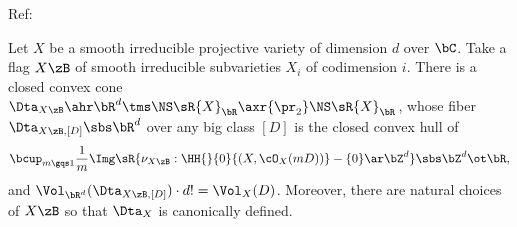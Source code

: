 \documentclass[a4paper, twoside]{article}
\begin{document}
\confighead{}{}{}


Ref:~\cite{LM2009Convex}


\begin{thm}
    Let $X$ be a smooth irreducible projective variety of dimension $d$ over $\bC$. Take a flag $X\zB$ of smooth irreducible subvarieties $X_{i}$ of codimension $i$. There is a closed convex cone $\Dta_{X\zB}\ahr\bR^{d}\tms\NS\sR{X}_{\bR}\axr{\pr_{2}}\NS\sR{X}_{\bR}$, whose fiber $\Dta_{X\zB,[D]}\sbs\bR^{d}$ over any big class $[D]$ is the closed convex hull of
    \[
        \bcup_{m\gqs1}\frac{1}{m}\Img\sR{\nu_{X\zB}:\HH{}{0}{(X,\cO_{X}(mD))}-\{0\}\ar\bZ^{d}}\sbs\bZ^{d}\ot\bR,
    \]
    and $\Vol_{\bR^{d}}(\Dta_{X\zB,[D]})\cdot d!=\Vol_{X}(D)$. Moreover, there are natural choices of $X\zB$ so that $\Dta_{X}$ is canonically defined.
\end{thm}


\printref
\end{document}
